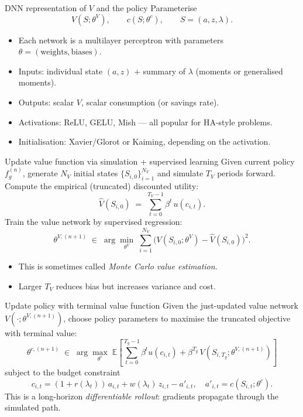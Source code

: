 \documentclass[10pt,english,aspectratio=169]{beamer}
\begin{document}
\begin{frame}{DNN representation of $V$ and the policy}
Parameterise
\[
V(S;\theta^V), \qquad c(S;\theta^c), \qquad S = (a, z, \lambda).
\]
\medskip
\begin{itemize}
\item Each network is a multilayer perceptron with parameters $\theta = (\text{weights}, \text{biases})$.
\item Inputs: individual state $(a,z)$ + summary of $\lambda$ (moments or generalised moments).
\item Outputs: scalar $V$, scalar consumption (or savings rate).
\medskip
\item Activations: ReLU, GELU, Mish --- all popular for HA-style problems.
\item Initialisation: Xavier/Glorot or Kaiming, depending on the activation.
\end{itemize}
\end{frame}

\begin{frame}{Update value function via simulation + supervised learning}
Given current policy $f_g^{(n)}$, generate $N_V$ initial states $\{S_{i,0}\}_{i=1}^{N_V}$ and simulate $T_V$ periods forward. Compute the empirical (truncated) discounted utility:
\[
\hat V(S_{i,0}) \;=\; \sum_{t=0}^{T_V-1} \beta^t \, u(c_{i,t}).
\]
\medskip
Train the value network by supervised regression:
\[
\theta^{V,(n+1)} \;\in\; \arg\min_{\theta^V}\;
\sum_{i=1}^{N_V} \big(V(S_{i,0};\theta^V) - \hat V(S_{i,0})\big)^2.
\]
\medskip
\begin{itemize}
\item This is sometimes called \emph{Monte Carlo value estimation}.
\item Larger $T_V$ reduces bias but increases variance and cost.
\end{itemize}
\end{frame}

\begin{frame}{Update policy with terminal value function}
Given the just-updated value network $V(\cdot;\theta^{V,(n+1)})$, choose policy parameters to maximise the truncated objective with terminal value:
\[
\theta^{c,(n+1)} \;\in\; \arg\max_{\theta^c}\;
\mathbb{E}\!\left[\sum_{t=0}^{T_g-1}\beta^t u(c_{i,t}) + \beta^{T_g}\, V(S_{i,T_g};\theta^{V,(n+1)})\right]
\]
subject to the budget constraint
\[
c_{i,t} = (1+r(\lambda_t))\,a_{i,t} + w(\lambda_t)\,z_{i,t} - a'_{i,t},
\quad a'_{i,t} = c(S_{i,t};\theta^c).
\]
\medskip
This is a long-horizon \emph{differentiable rollout}: gradients propagate through the simulated path.
\end{frame}
\end{document}
